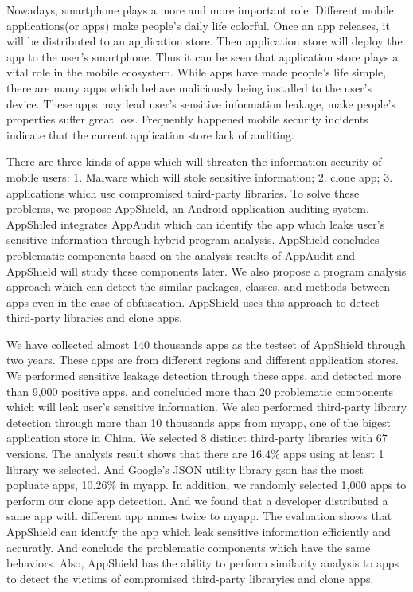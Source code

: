 \begin{englishabstract}

Nowadays, smartphone plays a more and more important role.
Different mobile applications(or apps) make people's daily life colorful. 
Once an app releases, it will be distributed to an application store.
Then application store will deploy the app to the user's smartphone.
Thus it can be seen that application store plays a vital role in the mobile ecosystem.
While apps have made people's life simple, there are many apps which behave maliciously being installed to the user's device.
These apps may lead user's sensitive information leakage, make people's properties suffer great loss.
Frequently happened mobile security incidents indicate that the current application store lack of auditing.

There are three kinds of apps which will threaten the information security of mobile users: 1. Malware which will stole sensitive information; 2. clone app; 3. applications which use compromised third-party libraries.
To solve these problems, we propose AppShield, an Android application auditing system.
AppShiled integrates AppAudit which can identify the app which leaks user's sensitive information through hybrid program analysis.
AppShield concludes problematic components based on the analysis results of AppAudit and AppShield will study these components later.
We also propose a program analysis approach which can detect the similar packages, classes, and methods between apps even in the case of obfuscation.
AppShield uses this approach to detect third-party libraries and clone apps.

We have collected almost 140 thousands apps as the testset of AppShield through two years.
These apps are from different regions and different application stores.
We performed sensitive leakage detection through these apps, and detected more than 9,000 positive apps, and concluded more than 20 problematic components which will leak user's sensitive information.
We also performed third-party library detection through more than 10 thousands apps from myapp, one of the bigest application store in China.
We selected 8 distinct third-party libraries with 67 versions.
The analysis result shows that there are 16.4\% apps using at least 1 library we selected.
And Google's JSON utility library gson has the most popluate apps, 10.26\% in myapp.
In addition, we randomly selected 1,000 apps to perform our clone app detection. And we found that a developer distributed a same app with different app names twice to myapp.
The evaluation shows that AppShield can identify the app which leak sensitive information efficiently and accuratly.
And conclude the problematic components which have the same behaviors.
Also, AppShield has the ability to perform similarity analysis to apps to detect the victims of compromised third-party libraryies and clone apps.


\end{englishabstract}

